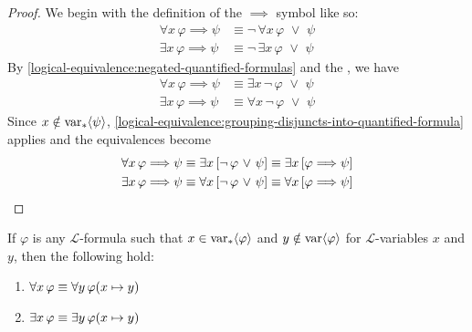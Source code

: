 \begin{proof}
    We begin with the definition of the \( {\implies} \) symbol like so:
    \begin{align*}
        \forall x \, \varphi {\implies} \psi &\equiv \lnot \, \forall x \, \varphi \,\,{\lor}\,\, \psi\\
        \exists x \, \varphi {\implies} \psi &\equiv \lnot \, \exists x \, \varphi \,\,{\lor}\,\, \psi
    \end{align*}
    By \cref{logical-equivalence:negated-quantified-formulas} and the , we have
    \begin{align*}
        \forall x \, \varphi {\implies} \psi &\equiv \exists x \, \lnot \, \varphi \,\,{\lor}\,\, \psi\\
        \exists x \, \varphi {\implies} \psi &\equiv \forall x \, \lnot \, \varphi \,\,{\lor}\,\, \psi
    \end{align*}
    Since \( x \notin \operatorname{var}_{\ast} \langle\psi\rangle \), \cref{logical-equivalence:grouping-disjuncts-into-quantified-formula} applies and the equivalences become
    \begin{align*}
        \forall x \, \varphi {\implies} \psi &\equiv \exists x \, \mleft[ \lnot \, \varphi \,\,{\lor}\,\, \psi \mright] \equiv \exists x \, \mleft[ \varphi {\implies} \psi \mright]\\
        \exists x \, \varphi {\implies} \psi &\equiv \forall x \, \mleft[ \lnot \, \varphi \,\,{\lor}\,\, \psi \mright] \equiv \forall x \, \mleft[ \varphi {\implies} \psi \mright]
        \qedhere
    \end{align*}
\end{proof}

\begin{thm}
     \label{logical-equivalence:changing-free-variables-does-not-affect-quantification}
    If \( \varphi \) is any \( \mathcal{L} \)-formula such that \( x \in \operatorname{var}_{\ast} \langle\varphi\rangle \) and \( y \notin \operatorname{var} \langle\varphi\rangle \)
    for \( \mathcal{L} \)-variables \( x \) and \( y \), then the following hold:
    \begin{enumerate}[topsep=2pt,label=\textup{\texttt{(\alph*)}}]
        \item \( \forall x \, \varphi \equiv \forall y \, \folfreevariablereplacement{\varphi}{x}{y} \)  \label{enum:variable-change-for-universal-quantifier}
        \item \( \exists x \, \varphi \equiv \exists y \, \folfreevariablereplacement{\varphi}{x}{y} \)  \label{enum:variable-change-for-existential-quantifier}
    \end{enumerate}
\end{thm}

